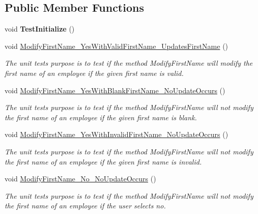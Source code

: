 \subsection*{Public Member Functions}
\begin{DoxyCompactItemize}
\item 
\hypertarget{class_the_company_1_1_tests_1_1_modify_employee_tests_a65112ca98fa3f0585dae3df2d90135d7}{}void {\bfseries Test\+Initialize} ()\label{class_the_company_1_1_tests_1_1_modify_employee_tests_a65112ca98fa3f0585dae3df2d90135d7}

\item 
void \hyperlink{class_the_company_1_1_tests_1_1_modify_employee_tests_a5aba329c3ebaea60709e7e78a40a3688}{Modify\+First\+Name\+\_\+\+Yes\+With\+Valid\+First\+Name\+\_\+\+Updates\+First\+Name} ()
\begin{DoxyCompactList}\small\item\em The unit test\textquotesingle{}s purpose is to test if the method Modify\+First\+Name will modify the first name of an employee if the given first name is valid. \end{DoxyCompactList}\item 
void \hyperlink{class_the_company_1_1_tests_1_1_modify_employee_tests_a7b1144d856a08cb49c40cfbeab07c7e6}{Modify\+First\+Name\+\_\+\+Yes\+With\+Blank\+First\+Name\+\_\+\+No\+Update\+Occurs} ()
\begin{DoxyCompactList}\small\item\em The unit test\textquotesingle{}s purpose is to test if the method Modify\+First\+Name will not modify the first name of an employee if the given first name is blank. \end{DoxyCompactList}\item 
void \hyperlink{class_the_company_1_1_tests_1_1_modify_employee_tests_a883e2ab136cadddc5c711921f65a8618}{Modify\+First\+Name\+\_\+\+Yes\+With\+Invalid\+First\+Name\+\_\+\+No\+Update\+Occurs} ()
\begin{DoxyCompactList}\small\item\em The unit test\textquotesingle{}s purpose is to test if the method Modify\+First\+Name will not modify the first name of an employee if the given first name is invalid. \end{DoxyCompactList}\item 
void \hyperlink{class_the_company_1_1_tests_1_1_modify_employee_tests_ae68565f1740b38af1cd06a5b9aa4ba2c}{Modify\+First\+Name\+\_\+\+No\+\_\+\+No\+Update\+Occurs} ()
\begin{DoxyCompactList}\small\item\em The unit test\textquotesingle{}s purpose is to test if the method Modify\+First\+Name will not modify the first name of an employee if the user selects no. \end{DoxyCompactList}\item 

\end{DoxyCompactItemize}

